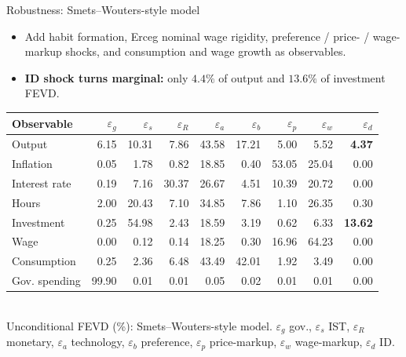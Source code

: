 \documentclass[9pt]{beamer}
\begin{document}
\begin{frame}{Robustness: Smets--Wouters-style model}
	\begin{itemize}
		\item Add habit formation, Erceg nominal wage rigidity, preference / price- / wage-markup shocks, and consumption and wage growth as observables.
		\item \textbf{ID shock turns marginal:} only $4.4\%$ of output and $13.6\%$ of investment FEVD.
	\end{itemize}
	\vspace{0.2em}
	\centering
	\footnotesize
	\begin{tabular}{l r r r r r r r r}
		\hline\hline
		Observable & $\varepsilon_g$ & \textcolor{accent}{$\varepsilon_{s}$} & $\varepsilon_R$ & $\varepsilon_a$ & $\varepsilon_b$ & $\varepsilon_p$ & $\varepsilon_w$ & \textcolor{invest}{$\varepsilon_{d}$} \\ 
		\hline
		Output & 6.15 & 10.31 & 7.86 & 43.58 & 17.21 & 5.00 & 5.52 & \textbf{4.37} \\ 
		Inflation & 0.05 & 1.78 & 0.82 & 18.85 & 0.40 & 53.05 & 25.04 & 0.00 \\ 
		Interest rate & 0.19 & 7.16 & 30.37 & 26.67 & 4.51 & 10.39 & 20.72 & 0.00 \\ 
		Hours & 2.00 & 20.43 & 7.10 & 34.85 & 7.86 & 1.10 & 26.35 & 0.30 \\ 
		Investment & 0.25 & 54.98 & 2.43 & 18.59 & 3.19 & 0.62 & 6.33 & \textbf{13.62} \\ 
		Wage & 0.00 & 0.12 & 0.14 & 18.25 & 0.30 & 16.96 & 64.23 & 0.00 \\ 
		Consumption & 0.25 & 2.36 & 6.48 & 43.49 & 42.01 & 1.92 & 3.49 & 0.00 \\ 
		Gov. spending & 99.90 & 0.01 & 0.01 & 0.05 & 0.02 & 0.01 & 0.01 & 0.00 \\ 
		\hline
	\end{tabular}
	\\[0.4em]
	{\scriptsize Unconditional FEVD (\%): Smets--Wouters-style model. $\varepsilon_g$ gov., \textcolor{accent}{$\varepsilon_s$ IST}, $\varepsilon_R$ monetary, $\varepsilon_a$ technology, $\varepsilon_b$ preference, $\varepsilon_p$ price-markup, $\varepsilon_w$ wage-markup, \textcolor{invest}{$\varepsilon_d$ ID}.}
\end{frame}
\end{document}
